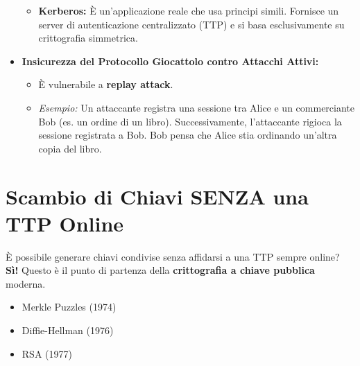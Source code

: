 \begin{itemize}
\begin{itemize}
\begin{itemize}
                \end{itemize}
            \item \textbf{Kerberos:} È un'applicazione reale che usa principi simili. Fornisce un server di autenticazione centralizzato (TTP) e si basa esclusivamente su crittografia simmetrica.
        \end{itemize}
    \item \textbf{Insicurezza del Protocollo Giocattolo contro Attacchi Attivi:}
        \begin{itemize}
            \item È vulnerabile a \textbf{replay attack}.
            \item \textit{Esempio:} Un attaccante registra una sessione tra Alice e un commerciante Bob (es. un ordine di un libro). Successivamente, l'attaccante rigioca la sessione registrata a Bob. Bob pensa che Alice stia ordinando un'altra copia del libro.
        \end{itemize}
\end{itemize}

\section{Scambio di Chiavi SENZA una TTP Online}
È possibile generare chiavi condivise senza affidarsi a una TTP sempre online? \textbf{Sì!}
Questo è il punto di partenza della \textbf{crittografia a chiave pubblica} moderna.
\begin{itemize}
    \item Merkle Puzzles (1974)
    \item Diffie-Hellman (1976)
    \item RSA (1977)
\end{itemize}

